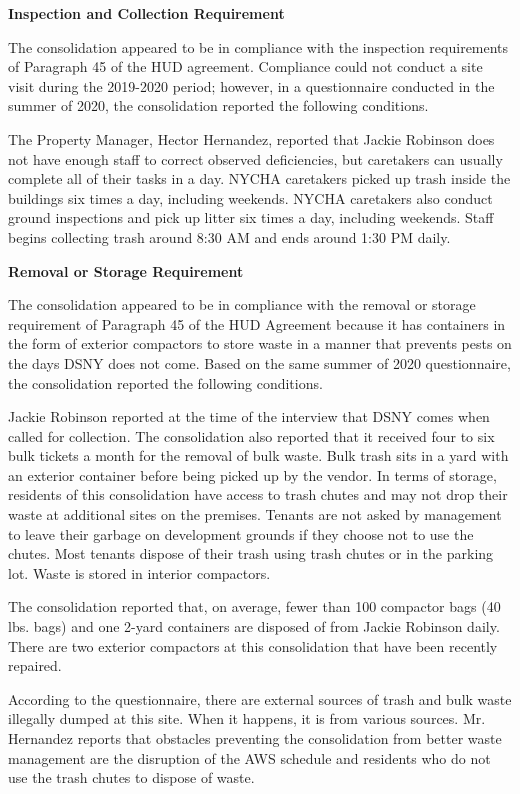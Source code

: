 
\textbf{Inspection and Collection Requirement}

The consolidation appeared to be in compliance with the inspection requirements of Paragraph 45 of the HUD agreement. Compliance could not conduct a site visit during the 2019-2020 period; however, in a questionnaire conducted in the summer of 2020, the consolidation reported the following conditions.

 The Property Manager, Hector Hernandez, reported that Jackie Robinson does not have enough staff to correct observed deficiencies, but caretakers can usually complete all of their tasks in a day. NYCHA caretakers picked up trash inside the buildings six times a day, including weekends. NYCHA caretakers also conduct ground inspections and pick up litter six times a day, including weekends. Staff begins collecting trash around 8:30 AM and ends around 1:30 PM daily.

\textbf{Removal or Storage Requirement}

The consolidation appeared to be in compliance with the  removal or storage requirement of Paragraph  45 of the HUD Agreement because it has containers in the form of exterior compactors to store waste in a manner that prevents pests on the days DSNY does not come. Based on the same summer of  2020 questionnaire, the consolidation reported the following conditions.

Jackie Robinson reported at the time of the interview that DSNY comes when called for collection. The consolidation also reported that it received four to six bulk tickets a month for the removal of bulk waste. Bulk trash sits in a yard with an exterior container before being picked up by the vendor. In terms of storage, residents of this consolidation have access to trash chutes and may not drop their waste at additional sites on the premises. Tenants are not asked by management to leave their garbage on development grounds if they choose not to use the chutes. Most tenants dispose of their trash using trash chutes or in the parking lot. Waste is stored in interior compactors. 

The consolidation reported that, on average, fewer than 100 compactor bags (40 lbs. bags) and one 2-yard containers are disposed of from Jackie Robinson daily. There are two exterior compactors at this consolidation that have been recently repaired. 

 According to the questionnaire, there are external sources of trash and bulk waste illegally dumped at this site. When it happens, it is from various sources. Mr. Hernandez reports that obstacles preventing the consolidation from better waste management are the disruption of the AWS schedule and residents who do not use the trash chutes to dispose of waste.